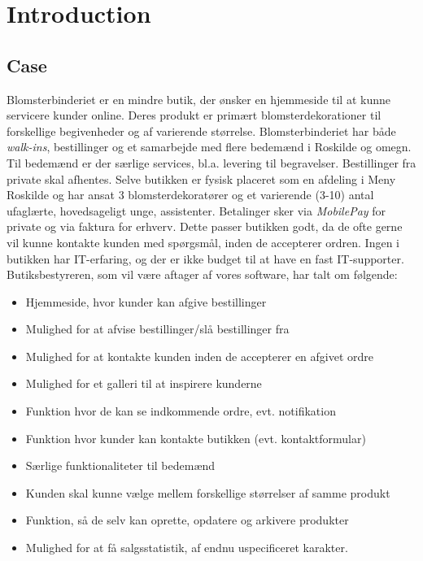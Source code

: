 \chapter{Introduction}
\label{chapter:introduction}

\section{Case}
Blomsterbinderiet er en mindre butik, der ønsker en hjemmeside til at kunne servicere kunder online.
Deres produkt er primært blomsterdekorationer til forskellige begivenheder og af varierende størrelse.
Blomsterbinderiet har både \emph{walk-ins}, bestillinger og et samarbejde med flere bedemænd i Roskilde og omegn. Til bedemænd er der særlige services, bl.a. levering til begravelser. Bestillinger fra private skal afhentes.
Selve butikken er fysisk placeret som en afdeling i Meny Roskilde og har ansat 3 blomsterdekoratører og et varierende (3-10) antal ufaglærte, hovedsageligt unge, assistenter.
Betalinger sker via \emph{MobilePay} for private og via faktura for erhverv. Dette passer butikken godt, da de ofte gerne vil kunne kontakte kunden med spørgsmål, inden de accepterer ordren.
Ingen i butikken har IT-erfaring, og der er ikke budget til at have en fast IT-supporter. Butiksbestyreren, som vil være aftager af vores software, har talt om følgende:
\begin{itemize}
	\item Hjemmeside, hvor kunder kan afgive bestillinger
	\item Mulighed for at afvise bestillinger/slå bestillinger fra
	\item Mulighed for at kontakte kunden inden de accepterer en afgivet ordre
	\item Mulighed for et galleri til at inspirere kunderne
	\item Funktion hvor de kan se indkommende ordre, evt. notifikation
	\item Funktion hvor kunder kan kontakte butikken (evt. kontaktformular)
	\item Særlige funktionaliteter til bedemænd
	\item Kunden skal kunne vælge mellem forskellige størrelser af samme produkt
	\item Funktion, så de selv kan oprette, opdatere og arkivere produkter
	\item Mulighed for at få salgsstatistik, af endnu uspecificeret karakter.
	\label{list:butikkens-ønsker}
\end{itemize}

